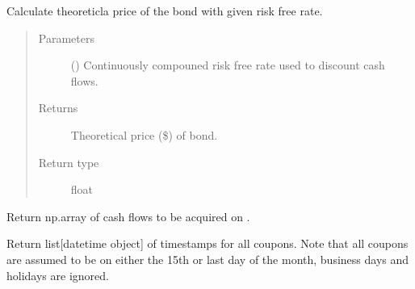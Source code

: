 \documentclass[letterpaper,10pt,english]{report}
\begin{document}
\begin{fulllineitems}
\begin{fulllineitems}
\end{fulllineitems}


\begin{fulllineitems}
\label{\detokenize{index:lgimapy.models.TBond.calculate_price}}
Calculate theoreticla price of the bond with given
risk free rate.
\begin{quote}\begin{description}
\item[{Parameters}] \leavevmode
{} () \textendash{} Continuously compouned risk free rate used to discount
cash flows.

\item[{Returns}] \leavevmode
{} \textendash{} Theoretical price (\$) of bond.

\item[{Return type}] \leavevmode
float

\end{description}\end{quote}

\end{fulllineitems}


\begin{fulllineitems}
\label{\detokenize{index:lgimapy.models.TBond.cash_flows}}
Return np.array of cash flows to be acquired on .

\end{fulllineitems}


\begin{fulllineitems}
Return list{[}datetime object{]} of timestamps for all coupons.
Note that all coupons are assumed to be on either the 15th or
last day of the month, business days and holidays are ignored.


\end{fulllineitems}
\end{fulllineitems}
\end{document}
